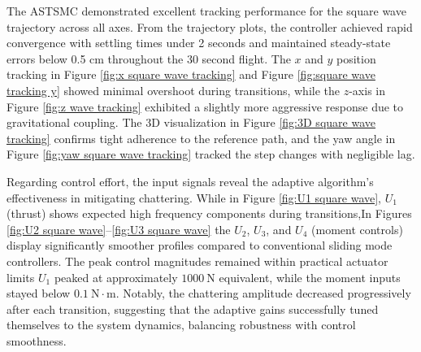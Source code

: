 


The ASTSMC demonstrated excellent tracking performance for the square wave trajectory across all axes. From the trajectory plots, the controller achieved rapid convergence with settling times under 2 seconds and maintained steady-state errors below 0.5 cm throughout the 30 second flight. The $x$ and $y$ position tracking in Figure \ref{fig:x square wave tracking} and Figure \ref{fig:square wave tracking y} showed minimal overshoot during transitions, while the $z$-axis in Figure \ref{fig:z wave tracking} exhibited a slightly more aggressive response due to gravitational coupling. The 3D visualization in Figure  \ref{fig:3D square wave tracking} confirms tight adherence to the reference path, and the yaw angle in Figure \ref{fig:yaw square wave tracking} tracked the step changes with negligible lag.

Regarding control effort, the input signals reveal the adaptive algorithm's effectiveness in mitigating chattering. While in Figure \ref{fig:U1 square wave},  $U_{1}$ (thrust) shows expected high frequency components during transitions,In Figures \ref{fig:U2 square wave}--\ref{fig:U3 square wave} the  $U_{2}$, $U_{3}$, and $U_{4}$ (moment controls) display significantly smoother profiles compared to conventional sliding mode controllers. The peak control magnitudes remained within practical actuator limits $U_{1}$ peaked at approximately $1000~\text{N}$ equivalent, while the moment inputs stayed below $0.1~\text{N}\cdot\text{m}$. Notably, the chattering amplitude decreased progressively after each transition, suggesting that the adaptive gains successfully tuned themselves to the system dynamics, balancing robustness with control smoothness.



